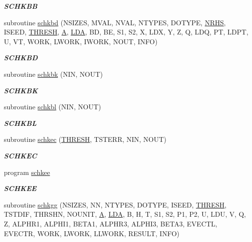 \begin{DoxyCompactItemize}
\begin{DoxyCompactList}\small\item\em {\bfseries S\+C\+H\+K\+B\+B} \end{DoxyCompactList}\item 
subroutine \hyperlink{group__single__eig_ga03e7367f702235ab4a852cec4d6dd1c8}{schkbd} (N\+S\+I\+Z\+E\+S, M\+V\+A\+L, N\+V\+A\+L, N\+T\+Y\+P\+E\+S, D\+O\+T\+Y\+P\+E, \hyperlink{example__user_8c_aa0138da002ce2a90360df2f521eb3198}{N\+R\+H\+S}, I\+S\+E\+E\+D, \hyperlink{zlaqgs_8c_a0656018abfc9fa2821827415f5d5ea57}{T\+H\+R\+E\+S\+H}, \hyperlink{classA}{A}, \hyperlink{example__user_8c_ae946da542ce0db94dced19b2ecefd1aa}{L\+D\+A}, B\+D, B\+E, S1, S2, X, L\+D\+X, Y, Z, Q, L\+D\+Q, P\+T, L\+D\+P\+T, U, V\+T, W\+O\+R\+K, L\+W\+O\+R\+K, I\+W\+O\+R\+K, N\+O\+U\+T, I\+N\+F\+O)
\begin{DoxyCompactList}\small\item\em {\bfseries S\+C\+H\+K\+B\+D} \end{DoxyCompactList}\item 
subroutine \hyperlink{group__single__eig_gaf2b54e7c6663d08f2287b4d8227e53bf}{schkbk} (N\+I\+N, N\+O\+U\+T)
\begin{DoxyCompactList}\small\item\em {\bfseries S\+C\+H\+K\+B\+K} \end{DoxyCompactList}\item 
subroutine \hyperlink{group__single__eig_ga0625d9829033282f25e479936bdaee20}{schkbl} (N\+I\+N, N\+O\+U\+T)
\begin{DoxyCompactList}\small\item\em {\bfseries S\+C\+H\+K\+B\+L} \end{DoxyCompactList}\item 
subroutine \hyperlink{group__single__eig_ga59636355218ca7955eee8e253db3329a}{schkec} (\hyperlink{zlaqgs_8c_a0656018abfc9fa2821827415f5d5ea57}{T\+H\+R\+E\+S\+H}, T\+S\+T\+E\+R\+R, N\+I\+N, N\+O\+U\+T)
\begin{DoxyCompactList}\small\item\em {\bfseries S\+C\+H\+K\+E\+C} \end{DoxyCompactList}\item 
program \hyperlink{group__single__eig_gaa05ae9ee47877fe74bea22f30f3e1b41}{schkee}
\begin{DoxyCompactList}\small\item\em {\bfseries S\+C\+H\+K\+E\+E} \end{DoxyCompactList}\item 
subroutine \hyperlink{group__single__eig_ga9f423a19ff92049fe736bf71a7bfa7c7}{schkgg} (N\+S\+I\+Z\+E\+S, N\+N, N\+T\+Y\+P\+E\+S, D\+O\+T\+Y\+P\+E, I\+S\+E\+E\+D, \hyperlink{zlaqgs_8c_a0656018abfc9fa2821827415f5d5ea57}{T\+H\+R\+E\+S\+H}, T\+S\+T\+D\+I\+F, T\+H\+R\+S\+H\+N, N\+O\+U\+N\+I\+T, \hyperlink{classA}{A}, \hyperlink{example__user_8c_ae946da542ce0db94dced19b2ecefd1aa}{L\+D\+A}, B, H, T, S1, S2, P1, P2, U, L\+D\+U, V, Q, Z, A\+L\+P\+H\+R1, A\+L\+P\+H\+I1, B\+E\+T\+A1, A\+L\+P\+H\+R3, A\+L\+P\+H\+I3, B\+E\+T\+A3, E\+V\+E\+C\+T\+L, E\+V\+E\+C\+T\+R, W\+O\+R\+K, L\+W\+O\+R\+K, L\+L\+W\+O\+R\+K, R\+E\+S\+U\+L\+T, I\+N\+F\+O)

\end{DoxyCompactItemize}

